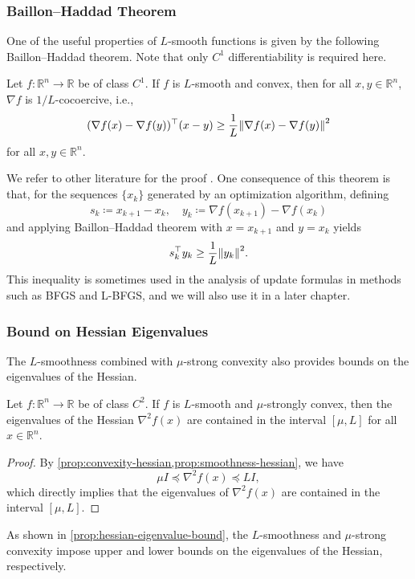 \documentclass[0_en]{subfiles}
\begin{document}
\subsubsection{Baillon--Haddad Theorem}

One of the useful properties of $L$-smooth functions is given by the following Baillon--Haddad theorem.
Note that only $C^1$ differentiability is required here.
\begin{proposition}\label{prop:baillon_haddad}
    Let $f \colon \mathbb{R}^n \to \mathbb{R}$ be of class $C^1$. If $f$ is $L$-smooth and convex, then for all $x,y \in \mathbb{R}^n$, $\nabla f$ is $1/L$-cocoercive, i.e.,
    \begin{equation}\label{eq:cocoercive}
        (\nabla f(x)-\nabla f(y))^\top (x-y) \ge \frac{1}{L} \norm{\nabla f(x)-\nabla f(y)}^2
    \end{equation}
    for all $x,y \in \mathbb{R}^n$.
\end{proposition}
We refer to other literature for the proof \citep{bauschkeBaillonHaddadTheoremRevisited2009} \citep[Proposition 12.60]{rockafellarVariationalAnalysis1998}.
One consequence of this theorem is that, for the sequences $\{x_k\}$ generated by an optimization algorithm, defining
\begin{equation*}
    s_k \coloneqq x_{k+1}-x_k, \quad y_k \coloneqq \nabla f(x_{k+1}) - \nabla f(x_k)
\end{equation*}
and applying Baillon--Haddad theorem with $x=x_{k+1}$ and $y=x_k$ yields
\begin{equation*}
    s_k^\top y_k \ge \frac{1}{L} \norm{y_k}^2.
\end{equation*}
This inequality is sometimes used in the analysis of update formulas in methods such as BFGS and L-BFGS, and we will also use it in a later chapter.

\subsubsection{Bound on Hessian Eigenvalues}

The $L$-smoothness combined with $\mu$-strong convexity also provides bounds on the eigenvalues of the Hessian.
\begin{proposition}\label{prop:hessian-eigenvalue-bound}
    Let $f \colon \mathbb{R}^n \to \mathbb{R}$ be of class $C^2$.
    If $f$ is $L$-smooth and $\mu$-strongly convex, then the eigenvalues of the Hessian $\nabla^2 f(x)$ are contained in the interval $[\mu, L]$ for all $x \in \mathbb{R}^n$.
\end{proposition}
\begin{proof}
    By \cref{prop:convexity-hessian,prop:smoothness-hessian}, we have
    \begin{equation*}
        \mu I \preceq \nabla^2 f(x) \preceq L I,
    \end{equation*}
    which directly implies that the eigenvalues of $\nabla^2 f(x)$ are contained in the interval $[\mu, L]$.
\end{proof}
As shown in \cref{prop:hessian-eigenvalue-bound},  the $L$-smoothness and $\mu$-strong convexity impose upper and lower bounds on the eigenvalues of the Hessian, respectively.

\ifSubfilesClassLoaded{
    
    
}{}
\end{document}
